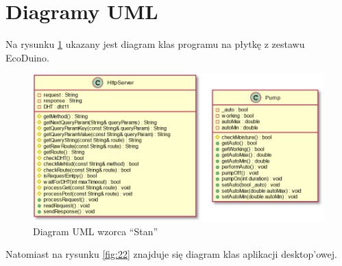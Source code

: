 \documentclass[a4paper,twoside,12pt]{book}
\begin{document}
\newpage

\section{Diagramy UML}

Na rysunku \ref{fig:21} ukazany jest diagram klas programu na płytkę z zestawu EcoDuino.

\begin{figure}[H]
   \centering
   \includegraphics[width=\textwidth]{./assets/img/img021.png}
   \caption{Diagram UML wzorca ``Stan'' \cite{bib:url009}}
   \label{fig:21}
\end{figure}

Natomiast na rysunku \ref{fig:22} znajduje się diagram klas aplikacji desktop'owej.
\end{document}
